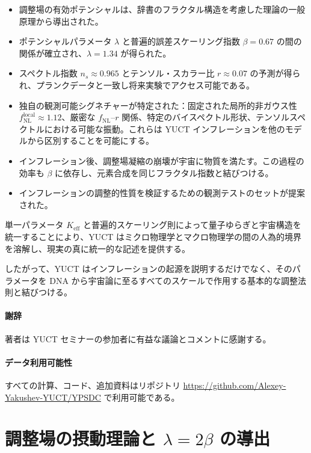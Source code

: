 \documentclass[11pt,a4paper]{article}
\theoremstyle{remark}
\begin{document}
	\begin{itemize}
		\item 調整場の有効ポテンシャルは、辞書のフラクタル構造を考慮した理論の一般原理から導出された。
		\item ポテンシャルパラメータ $\lambda$ と普遍的誤差スケーリング指数 $\beta = 0.67$ の間の関係が確立され、$\lambda = 1.34$ が得られた。
		\item スペクトル指数 $n_s \approx 0.965$ とテンソル・スカラー比 $r \approx 0.07$ の予測が得られ、プランクデータと一致し将来実験でアクセス可能である。
		\item 独自の観測可能シグネチャーが特定された：固定された局所的非ガウス性 $f_{\text{NL}}^{\text{local}} \approx 1.12$、厳密な $f_{\text{NL}}$–$r$ 関係、特定のバイスペクトル形状、テンソルスペクトルにおける可能な振動。これらは YUCT インフレーションを他のモデルから区別することを可能にする。
		\item インフレーション後、調整場凝縮の崩壊が宇宙に物質を満たす。この過程の効率も $\beta$ に依存し、元素合成を同じフラクタル指数と結びつける。
		\item インフレーションの調整的性質を検証するための観測テストのセットが提案された。
	\end{itemize}
	
	単一パラメータ $K_{\mathrm{eff}}$ と普遍的スケーリング則によって量子ゆらぎと宇宙構造を統一することにより、YUCT はミクロ物理学とマクロ物理学の間の人為的境界を溶解し、現実の真に統一的な記述を提供する。
	
	したがって、YUCT はインフレーションの起源を説明するだけでなく、そのパラメータを DNA から宇宙論に至るすべてのスケールで作用する基本的な調整法則と結びつける。
	
	\paragraph*{謝辞}
	著者は YUCT セミナーの参加者に有益な議論とコメントに感謝する。
	
	\paragraph*{データ利用可能性}
	すべての計算、コード、追加資料はリポジトリ \url{https://github.com/Alexey-Yakushev-YUCT/YPSDC} で利用可能である。
	
	\appendix
	\section{調整場の摂動理論と $\lambda = 2\beta$ の導出}
	\label{app:perturbations}
	
\end{document}
